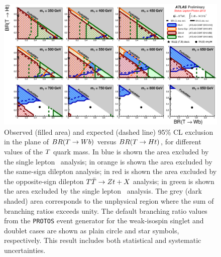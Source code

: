 \begin{landscape}
\begin{figure}[h!bt]
\centering
\includegraphics[width=1.5\textwidth]{results/figures/ATLAS_VLQ_TT_june2013_step4.eps}
\caption{
Observed (filled area) and expected (dashed line) 95\% CL exclusion in the plane of
$BR(\T \to Wb)$ versus $BR(\T \to Ht)$, for different values of the $\T$ quark mass.
In blue is shown the area excluded by the single lepton \htx\ analysis;
in orange is shown the area excluded by the same-sign dilepton analysis;
in red is shown the area excluded by the opposite-sign dilepton $\TTbar\to Zt+X$ analysis;
in green is shown the area excluded by the single lepton \wbx\ analysis.
The grey (dark shaded) area corresponds to the unphysical region where the sum of branching ratios exceeds unity. 
The default branching ratio values from the \texttt{PROTOS} event generator for the weak-isospin singlet and doublet cases 
are shown as plain circle and star symbols, respectively. This result includes both statistical and systematic uncertainties.
\label{fig:limits2D_allcombo}}
\end{figure}
\end{landscape}


